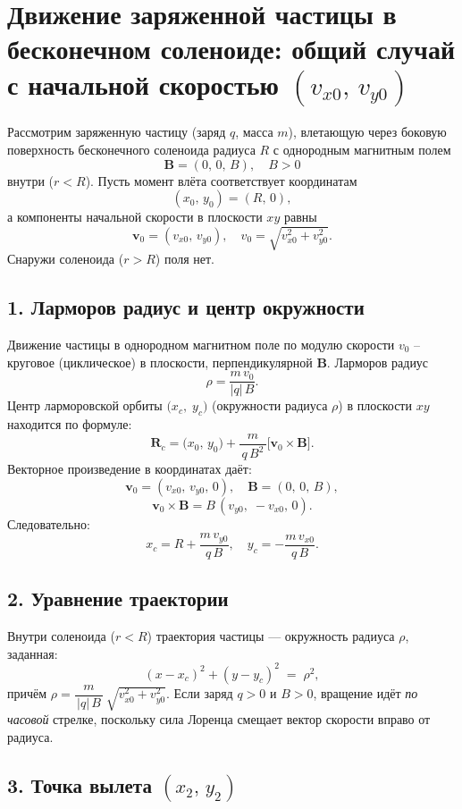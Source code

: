 \documentclass{article}
\begin{document}
\section*{Движение заряженной частицы в бесконечном соленоиде: общий случай с начальной скоростью \texorpdfstring{$(v_{x0},\,v_{y0})$}{(v\_x0, v\_y0)}}

Рассмотрим заряженную частицу (заряд $q$, масса $m$), влетающую через боковую поверхность бесконечного соленоида радиуса $R$ с однородным магнитным полем
\[
\mathbf{B} = (0,\,0,\,B),
\quad B>0
\]
внутри ($r<R$). Пусть момент влёта соответствует координатам
\[
(x_0,\,y_0) = (R,\,0),
\]
а компоненты начальной скорости в плоскости $xy$ равны
\[
\mathbf{v}_0 = (v_{x0},\,v_{y0}),
\quad
v_0 = \sqrt{v_{x0}^2 + v_{y0}^2}.
\]
Снаружи соленоида ($r>R$) поля нет.

\subsection*{1. Ларморов радиус и центр окружности}

Движение частицы в однородном магнитном поле по модулю скорости $v_0$ -- круговое (циклическое) в плоскости, перпендикулярной $\mathbf{B}$. Ларморов радиус
\[
\rho = \frac{m\,v_0}{|q|\,B}.
\]
Центр ларморовской орбиты $\bigl(x_c,\;y_c\bigr)$ (окружности радиуса $\rho$) в плоскости $xy$ находится по формуле:
\[
\mathbf{R}_c
=
\bigl(x_0,\,y_0\bigr)
+
\frac{m}{\,q\,B^2\,}
\bigl[\mathbf{v}_0 \times \mathbf{B}\bigr].
\]
Векторное произведение в координатах даёт:
\[
\mathbf{v}_0 = (v_{x0},\,v_{y0},\,0),
\quad
\mathbf{B} = (0,\,0,\,B),
\]
\[
\mathbf{v}_0 \times \mathbf{B}
=
B\,(v_{y0},\;-v_{x0},\,0).
\]
Следовательно:
\[
x_c
=
R + \frac{m\,v_{y0}}{\,q\,B\,},
\quad
y_c
=
-\frac{m\,v_{x0}}{\,q\,B\,}.
\]

\subsection*{2. Уравнение траектории}

Внутри соленоида ($r < R$) траектория частицы --- окружность радиуса $\rho$, заданная:
\[
(x - x_c)^2 + (y - y_c)^2 \;=\; \rho^2,
\]
причём $\rho = \dfrac{m}{\,|q|\,B\,}\,\sqrt{v_{x0}^2 + v_{y0}^2}$. Если заряд $q>0$ и $B>0$, вращение идёт \textit{по часовой} стрелке, поскольку сила Лоренца смещает вектор скорости вправо от радиуса.

\subsection*{3. Точка вылета \texorpdfstring{$(x_2,\,y_2)$}{(x2, y2)}}
\end{document}
